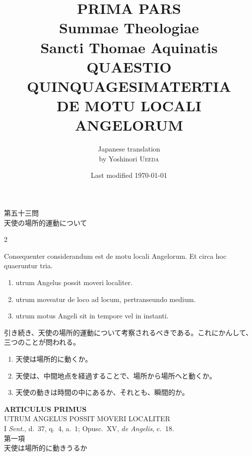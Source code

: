 \documentclass[paper=a4paper,fontsize=10pt,jafontsize=9pt,titlepage]{jlreq}
\title{{\bfseries PRIMA PARS}\\{\Huge Summae Theologiae}\\Sancti Thomae
Aquinatis\\{\sffamily QUAESTIO QUINQUAGESIMATERTIA}\\DE MOTU LOCALI ANGELORUM}
\author{Japanese translation\\by Yoshinori {\scshape Ueeda}}
\date{Last modified \today}
\begin{document}
\maketitle
\pagestyle{fancy}

\begin{center}
{\Large 第五十三問\\天使の場所的運動について}
\end{center}

\begin{paracol}{2}

Consequenter considerandum est de motu locali Angelorum. Et circa hoc
 quaeruntur tria.

\begin{enumerate}
 \item utrum Angelus possit moveri localiter.
 \item utrum moveatur de loco ad locum, pertranseundo medium.
 \item utrum motus Angeli sit in tempore vel in instanti.
\end{enumerate}

\switchcolumn

引き続き、天使の場所的運動について考察されるべきである。これにかんして、
 三つのことが問われる。

\begin{enumerate}
 \item 天使は場所的に動くか。
 \item 天使は、中間地点を経過することで、場所から場所へと動くか。
 \item 天使の動きは時間の中にあるか、それとも、瞬間的か。
\end{enumerate}

\end{paracol}

\newpage
{}
{}
\setcounter{section}{1}
\setcounter{subsection}{0}


\begin{center}
 {\Large {\bfseries ARTICULUS PRIMUS}}\\
 {\large UTRUM ANGELUS POSSIT MOVERI LOCALITER}\\
 {\footnotesize I {\itshape Sent.}, d.~37, q.~4, a.~1; Opusc.~XV,
 {\itshape de Angelis}, c.~18.}\\
 {\Large 第一項\\天使は場所的に動きうるか}
\end{center}
\end{document}
